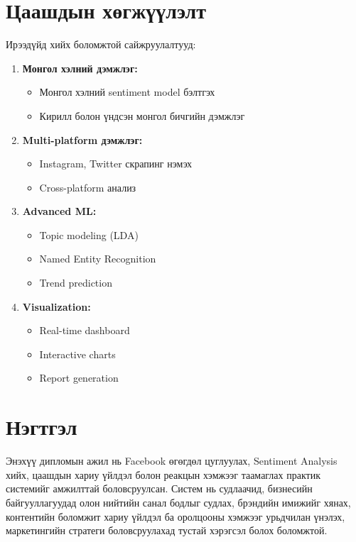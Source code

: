 \documentclass[12pt,a4paper]{report}
\begin{document}
\section{Цаашдын хөгжүүлэлт}

Ирээдүйд хийх боломжтой сайжруулалтууд:

\begin{enumerate}
    \item \textbf{Монгол хэлний дэмжлэг:}
    \begin{itemize}
        \item Монгол хэлний sentiment model бэлтгэх
        \item Кирилл болон үндсэн монгол бичгийн дэмжлэг
    \end{itemize}
    
    \item \textbf{Multi-platform дэмжлэг:}
    \begin{itemize}
        \item Instagram, Twitter скрапинг нэмэх
        \item Cross-platform анализ
    \end{itemize}
    
    \item \textbf{Advanced ML:}
    \begin{itemize}
        \item Topic modeling (LDA)
        \item Named Entity Recognition
        \item Trend prediction
    \end{itemize}
    
    \item \textbf{Visualization:}
    \begin{itemize}
        \item Real-time dashboard
        \item Interactive charts
        \item Report generation
    \end{itemize}
\end{enumerate}

\section{Нэгтгэл}

Энэхүү дипломын ажил нь Facebook өгөгдөл цуглуулах, Sentiment Analysis хийх, цаашдын хариу үйлдэл болон реакцын хэмжээг таамаглах практик системийг амжилттай боловсруулсан. Систем нь судлаачид, бизнесийн байгууллагуудад олон нийтийн санал бодлыг судлах, брэндийн имижийг хянах, контентийн боломжит хариу үйлдэл ба оролцооны хэмжээг урьдчилан үнэлэх, маркетингийн стратеги боловсруулахад тустай хэрэгсэл болох боломжтой.
\end{document}
